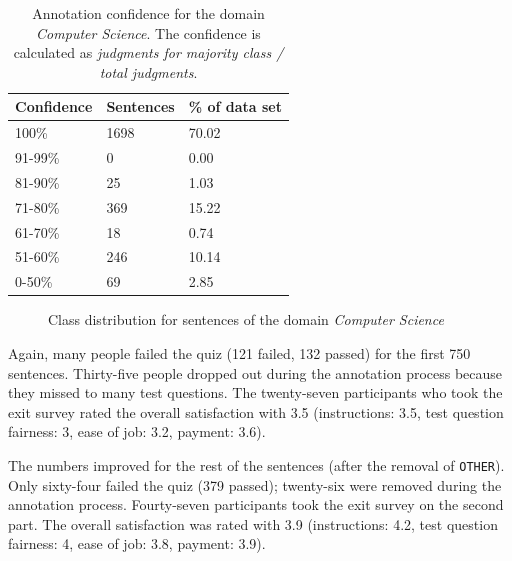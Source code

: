 \begin{table}[h]
\caption{Annotation confidence for the domain \emph{Computer Science}. The confidence is calculated as \emph{judgments for majority class / total judgments}. }
\label{fig:compsci_agg}
\begin{tabularx}{\textwidth}{XXX}
\toprule
Confidence & Sentences & \% of data set \\
\midrule
100\%	&	1698	&	70.02	 \\ 
91-99\%	&	0	&	0.00	 \\ 
81-90\%	&	25	&	1.03	 \\ 
71-80\%	&	369	&	15.22	 \\ 
61-70\%	&	18	&	0.74	 \\ 
51-60\%	&	246	&	10.14	 \\ 
0-50\%	&	69	&	2.85	 \\ 
\bottomrule
\end{tabularx}
\end{table}
\begin{figure}[h]
\centering
\caption{Class distribution for sentences of the domain \emph{Computer Science}}
\label{fig:compsci_fin}
\end{figure}

Again, many people failed the quiz (121 failed, 132 passed) for the first 750 sentences. Thirty-five people dropped out during the annotation process because they missed to many test questions. The twenty-seven participants who took the exit survey rated the overall satisfaction with 3.5 (instructions: 3.5, test question fairness: 3, ease of job: 3.2, payment: 3.6).

The numbers improved for the rest of the sentences (after the removal of \texttt{OTHER}). Only sixty-four failed the quiz (379 passed); twenty-six were removed during the annotation process. Fourty-seven participants took the exit survey on the second part. The overall satisfaction was rated with 3.9 (instructions: 4.2, test question fairness: 4, ease of job: 3.8, payment: 3.9).

